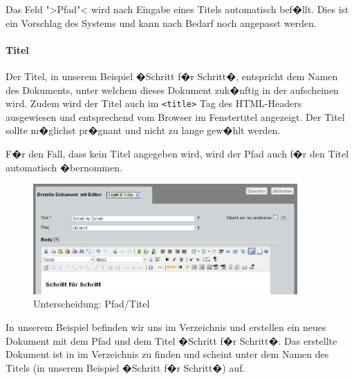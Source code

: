 \begin{Hinweis}
  Das Feld 
  ">Pfad"<
  wird nach Eingabe eines Titels automatisch bef�llt. Dies ist ein Vorschlag des Systems und kann nach Bedarf noch angepasst werden.
\end{Hinweis}


\paragraph{Titel}
\label{title}

Der Titel, in unserem Beispiel �Schritt f�r Schritt�, entspricht dem
Namen des Dokuments, unter welchem dieses Dokument zuk�nftig in der
 aufscheinen wird. Zudem wird der Titel
auch im \texttt{<title>} Tag des HTML-Headers ausgewiesen und
entsprechend vom Browser im Fenstertitel angezeigt. Der Titel sollte m�glichst pr�gnant und nicht zu lange gew�hlt werden.

F�r den Fall, dass kein Titel angegeben wird, wird 
der Pfad
auch f�r den Titel automatisch �bernommen.

\begin{figure}[!ht]
  \centering
  \includegraphics[width=0.9\textwidth]{./images/tinymce.png}
  \caption{Unterscheidung: Pfad/Titel}
  \label{fig:unterscheidunglocationtitel}
\end{figure}

In unserem Beispiel befinden wir uns im Verzeichnis
 und erstellen ein neues Dokument mit
dem Pfad  und dem Titel �Schritt f�r Schritt�. Das erstellte Dokument ist in  im
Verzeichnis  zu finden und scheint
unter dem Namen des Titels (in unserem Beispiel �Schritt f�r Schritt�)
auf.

